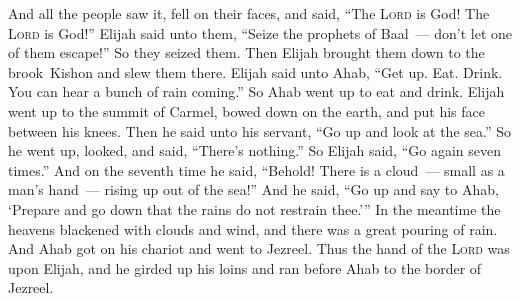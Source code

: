\begin{inparaenum}
   And all the people saw it, fell on their faces, and said, ``The \textsc{Lord} is God! The \textsc{Lord} is God!''%
   Elijah said unto them, ``Seize the prophets of Baal~--- don't let one of them escape!'' So they seized them. Then Elijah brought them down to the brook~Kishon and slew them there.%
   Elijah said unto Ahab, ``Get up. Eat. Drink. You can hear a bunch of rain coming.''%
   So Ahab went up to eat and drink. Elijah went up to the summit of Carmel, bowed down on the earth, and put his face between his knees.%
   Then he said unto his servant, ``Go up and look at the sea.'' So he went up, looked, and said, ``There's nothing.'' So Elijah said, ``Go again seven times.''%
   And on the seventh time he said, ``Behold! There is a cloud~--- small as a man's hand~--- rising up out of the sea!'' And he said, ``Go up and say to Ahab, `Prepare and go down that the rains do not restrain thee.'''%
   In the meantime the heavens blackened with clouds and wind, and there was a great pouring of rain. And Ahab got on his chariot and went to Jezreel.%
   Thus the hand of the \textsc{Lord} was upon Elijah, and he girded up his loins and ran before Ahab to the border of Jezreel.%
\end{inparaenum}
